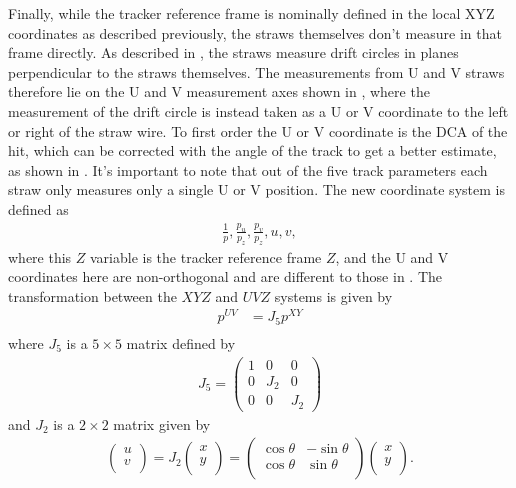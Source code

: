 Finally, while the tracker reference frame is nominally defined in the local XYZ coordinates as described previously, the straws themselves don't measure in that frame directly. As described in , the straws measure drift circles in planes perpendicular to the straws themselves. The measurements from U and V straws therefore lie on the U and V measurement axes shown in , where the measurement of the drift circle is instead taken as a U or V coordinate to the left or right of the straw wire. To first order the U or V coordinate is the DCA of the hit, which can be corrected with the angle of the track to get a better estimate, as shown in . It's important to note that out of the five track parameters each straw only measures only a single U or V position. The new coordinate system is defined as
        \begin{align} \label{eq:trackermeasurementframe}
            \frac{1}{p}, \frac{p_{u}}{p_{z}}, \frac{p_{v}}{p_{z}}, u, v,
        \end{align}
where this $Z$ variable is the tracker reference frame $Z$, and the U and V coordinates here are non-orthogonal and are different to those in . The transformation between the $XYZ$ and $UVZ$ systems is given by
    \begin{align}
        p^{UV} &= J_{5} p^{XY} \\
    \end{align}
where $J_{5}$ is a $5 \times 5$ matrix defined by
        \begin{align}
            J_{5} = 
            \begin{pmatrix}
                1 & 0 & 0 \\
                0 & J_{2} & 0 \\
                0 & 0 & J_{2}
            \end{pmatrix}
        \end{align}
and $J_{2}$ is a $2 \times 2$ matrix given by
        \begin{align}
            \begin{pmatrix}
                u \\
                v \\
            \end{pmatrix} =
            J_{2}
            \begin{pmatrix}
                x \\
                y \\
            \end{pmatrix} =
            \begin{pmatrix}
                \cos{\theta} & -\sin{\theta} \\
                \cos{\theta} & \sin{\theta} \\
            \end{pmatrix}
            \begin{pmatrix}
                x \\
                y \\
            \end{pmatrix}.
        \end{align}
